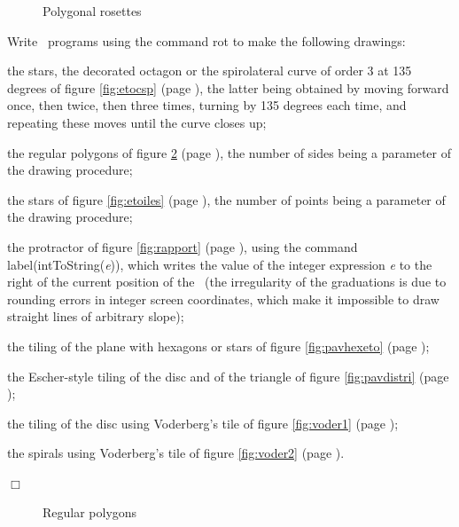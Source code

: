 \begin{figure}[htbp]
 \caption{Polygonal rosettes}\label{fig:rospol}
\end{figure}
\begin{exercices}{Write \python\ programs using the command {\idt rot}
to make the following drawings:

\tiret the stars, the decorated octagon or the spirolateral curve of order 3 at 135 degrees of figure
         \ref{fig:etocsp} (page \pageref{fig:etocsp}), the latter being obtained by moving forward once, then twice, then
		 three times, turning by 135 degrees each time, and repeating these moves until
		 the curve closes up;

\tiret the regular polygons of figure
         \ref{fig:polyreg} (page \pageref{fig:polyreg}), the number of sides being a parameter of the drawing
		 procedure;

\tiret the stars of figure
         \ref{fig:etoiles} (page \pageref{fig:etoiles}), the number of points being a parameter of the drawing
		 procedure;

\tiret the protractor of figure
         \ref{fig:rapport} (page \pageref{fig:rapport}), using
		 the command {\idt label(\allowbreak intToString(}{\em e}{\idt ))}, which writes the value of the integer expression {\em e}
		 to the right of the current position of the \robot\ (the irregularity of the graduations
		 is due to rounding errors in integer screen coordinates, which make it impossible to
		 draw straight lines of arbitrary slope);

\tiret the tiling of the plane with hexagons or stars of figure
         \ref{fig:pavhexeto} (page \pageref{fig:pavhexeto});

\tiret the Escher-style \cite{escher1} tiling of the disc and of the triangle of figure
         \ref{fig:pavdistri} (page \pageref{fig:pavdistri});

\tiret the tiling of the disc using Voderberg's tile \cite{voderberg} of figure
         \ref{fig:voder1} (page \pageref{fig:voder1});

\tiret the spirals using Voderberg's tile \cite{voderberg} of
         figure \ref{fig:voder2} (page \pageref{fig:voder2}).

\noindent $\Box$}\end{exercices}
\begin{figure}[htbp]
 \caption{Regular polygons}\label{fig:polyreg}
\end{figure}
